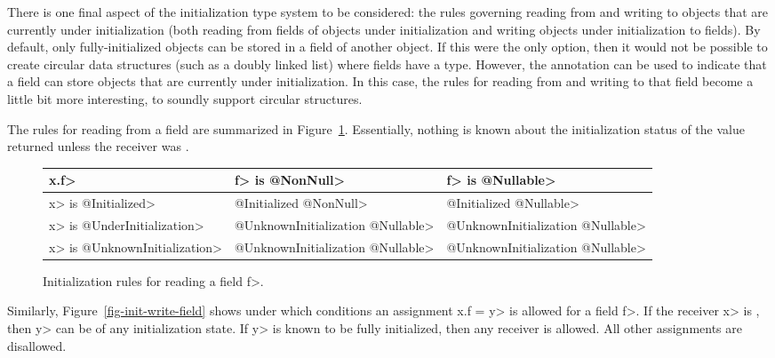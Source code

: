 There is one final aspect of the initialization type system to be
considered:  the rules governing reading from and writing to objects that are
currently under initialization (both reading from fields of objects under
initialization and writing objects under initialization to fields).
By default, only fully-initialized objects can be stored in a field of
another object.  If this were the only option, then it would not be possible
to create circular data structures (such as a doubly linked list) where
fields have a  type.  However,
the annotation
 can be used to
indicate that a field can store objects that are currently under initialization.
In this case, the rules for reading from and writing to that field become a little
bit more interesting, to soundly support circular structures.

The rules for reading from a
 field
are summarized in Figure~\ref{fig-init-read-field}.  Essentially, nothing is
known about the initialization status of the value returned unless the receiver
was .

\begin{figure}
\centering
\begin{tabular}{l|l|l}
  \<x.f>&\<f> is \<@NonNull>& \<f> is \<@Nullable>\\ \hline
  \<x> is \<@Initialized> & \<@Initialized @NonNull> & \<@Initialized @Nullable> \\
  \<x> is \<@UnderInitialization> & \<@UnknownInitialization @Nullable> & \<@UnknownInitialization @Nullable> \\
  \<x> is \<@UnknownInitialization> & \<@UnknownInitialization @Nullable> & \<@UnknownInitialization @Nullable> \\
\end{tabular}
\caption{Initialization rules for reading a  field \<f>.}
\label{fig-init-read-field}
\end{figure}

Similarly, Figure~\ref{fig-init-write-field} shows under which conditions
an assignment \<x.f = y> is allowed for a
 field \<f>.
If the receiver \<x> is
, then
\<y> can be of any initialization state.  If \<y> is known to be
fully initialized, then any receiver is allowed.  All other assignments
are disallowed.

